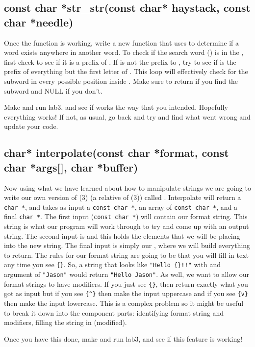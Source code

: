 \documentclass{tufte-handout}
\begin{document}
\subsection{{const char *str\_str(const char* haystack, const
char *needle)}}

Once the function  is working, write a new
function  that uses  to determine if a word exists anywhere in another word. To check if the search word () is in the , first check to see if it is a prefix of . If  is not the prefix to , try to see if  is the prefix of everything but the first letter of . This loop will effectively check for the subword  in every possible position inside . Make sure to return  if you find the subword and NULL if you don't.

Make and run lab3, and see if  works the way that you intended.  Hopefully everything works!  If not, as usual, go back and try and find what went wrong and update your code.

\subsection{{char* interpolate(const char *format, const char *args[], char *buffer)}}

Now using what we have learned about how to manipulate strings we are
going to write our own version of (3) (a relative
of (3)) called
. Interpolate will return a \verb!char *!, and takes
as input a \verb!const char *!, an array of \verb!const char *!, and
a final \verb!char *!. The
first input (\verb!const char *!)  will contain our format
string. This string is what our program will work through to try and
come up with an output string. The second input is  and
this holds the elements that we will be placing into the new string. The
final input is simply our , where we will build
everything to return. The rules for our format string are going to be
that you will fill in text any time you see \verb!{}!. So, a string that
looks like \verb^"Hello {}!!"^ with and argument of \texttt{"Jason"} would return
\verb!"Hello Jason"!. As well, we want to allow our format strings to have
modifiers. If you just see \verb^{}^, then return exactly what you got as
input but if you see \verb!{^}! then make the input uppercase and if you see
\texttt{\{v\}} then make the input lowercase. This is a complex problem so it might be useful to break it down into the component parts: identifying format string and modifiers, filling the string in (modified).

Once you have this done, make and run lab3, and see if this feature is working!
\end{document}
